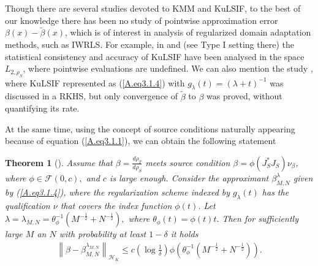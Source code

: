 \documentclass[USenglish]{article}
\newcommand{\norm}[1]{\left\lVert#1\right\rVert}
\newtheorem{theorem}{Theorem}[section]
\begin{document}
Though there are several studies devoted to KMM and KuLSIF, to the best of our knowledge there has been no study of pointwise approximation error $\beta (x) - \tilde{\beta} (x)$, which is of interest in analysis of regularized domain adaptation methods, such as IWRLS. For example, in \cite{kanamori2012} and \cite{que2013} (see Type I setting there) the statistical consistency and accuracy of KuLSIF have been analysed in the space $L_{2,\rho_S}$, where pointwise evaluations are undefined. We can also mention the study \cite{schuster2020}, where KuLSIF represented as (\ref{A.eq3.1.4}) with $g_\lambda (t) = (\lambda + t)^{-1}$ was discussed in a RKHS, but only convergence of $\tilde{\beta}$ to $\beta$ was proved, without quantifying its rate.
	
At the same time, using the concept of source conditions naturally appearing because of equation (\ref{A.eq3.1.1}), we can obtain the following statement

\begin{theorem}[\cite{gizewski2022regularization}]
\label{thm3.1}
		Assume that $\beta = \frac{d\rho_T}{d\rho_S}$ meets source condition $\beta = \phi (J_S^* J_S) \nu_\beta$, where $\phi \in \mathcal{F} (0,c),$ and $c$ is large enough. Consider the approximant $\beta_{M,N}^\lambda$ given by (\ref{A.eq3.1.4}), where the regularization scheme indexed by $g_\lambda (t)$ has the qualification $\nu$ that covers the index function $\phi (t)$. Let $\lambda = \lambda_{M,N} = \theta_\phi^{-1} (M^{-\frac{1}{2}} + N^{-\frac{1}{2}}),$ where $\theta_\phi (t) = \phi (t) t.$ Then for sufficiently large $M$ an $N$ with probability at least $1 - \delta$ it holds
		\begin{align}\label{1st_bound_beta}
		\norm{\beta - \beta_{M,N}^{\lambda_{M,N}} }_{\mathcal{H}_K} \leq c \left( \log \frac{1}{\delta} \right) \phi \left( \theta_\phi^{-1} (M^{-\frac{1}{2}} + N^{-\frac{1}{2}}) \right).
		\end{align}
\end{theorem}
\end{document}
